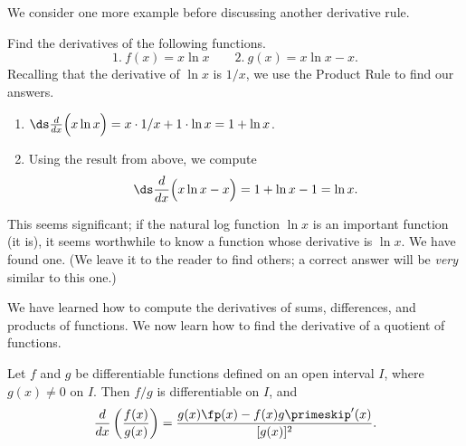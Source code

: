 We consider one more example before discussing another derivative rule.

\begin{example}\label{ex_deriv_ln}
Find the derivatives of the following functions.
\[1.\ f(x) = x\ln x\qquad 2.\ g(x) = x\ln x - x.\]
\solution
Recalling that the derivative of $\ln x$ is $1/x$, we use the Product Rule to find our answers.
\begin{enumerate}
	\item	$\ds \frac{d}{dx}\Bigl(x\ln x\Bigr) = x\cdot 1/x + 1\cdot \ln x = 1+\ln x$. 
	\item	Using the result from above, we compute
	\[\ds \frac{d}{dx}\Bigl(x\ln x-x\Bigr) = 1+\ln x-1 = \ln x.\]
\end{enumerate}
This seems significant; if the natural log function $\ln x$ is an important function (it is), it seems worthwhile to know a function whose derivative is $\ln x$. We have found one. (We leave it to the reader to find others; a correct answer will be \emph{very} similar to this one.)
\end{example}

We have learned how to compute the derivatives of sums, differences, and products of functions. We now learn how to find the derivative of a quotient of functions.\bigskip

\begin{theorem}\label{thm:QuotientRule}
Let $f$ and $g$ be differentiable functions defined on an open interval $I$, where $g(x) \neq 0$ on $I$. Then $f/g$ is differentiable on $I$, and \[\frac{d}{dx}\left(\frac{f(x)}{g(x)}\right) = \frac{g(x)\fp(x) - f(x)g\primeskip'(x)}{[g(x)]^2}.\]
\end{theorem}


